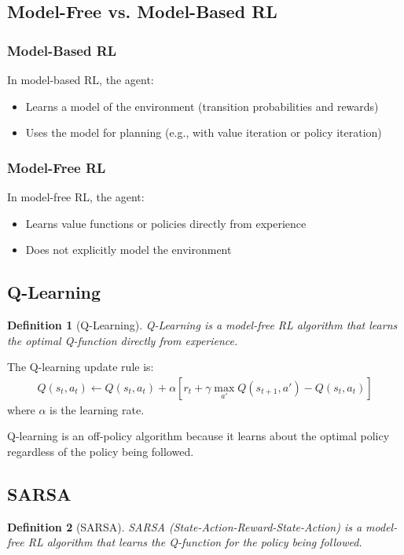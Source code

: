 \documentclass{article}
\newtheorem{definition}{Definition}
\begin{document}
\subsection{Model-Free vs. Model-Based RL}
\subsubsection{Model-Based RL}
In model-based RL, the agent:
\begin{itemize}
\item Learns a model of the environment (transition probabilities and rewards)
\item Uses the model for planning (e.g., with value iteration or policy iteration)
\end{itemize}

\subsubsection{Model-Free RL}
In model-free RL, the agent:
\begin{itemize}
\item Learns value functions or policies directly from experience
\item Does not explicitly model the environment
\end{itemize}

\subsection{Q-Learning}
\begin{definition}[Q-Learning]
Q-Learning is a model-free RL algorithm that learns the optimal Q-function directly from experience.
\end{definition}

The Q-learning update rule is:
\begin{align}
Q(s_t, a_t) \leftarrow Q(s_t, a_t) + \alpha\left[r_t + \gamma\max_{a'}Q(s_{t+1}, a') - Q(s_t, a_t)\right]
\end{align}
where $\alpha$ is the learning rate.

Q-learning is an off-policy algorithm because it learns about the optimal policy regardless of the policy being followed.

\subsection{SARSA}
\begin{definition}[SARSA]
SARSA (State-Action-Reward-State-Action) is a model-free RL algorithm that learns the Q-function for the policy being followed.
\end{definition}
\end{document}
